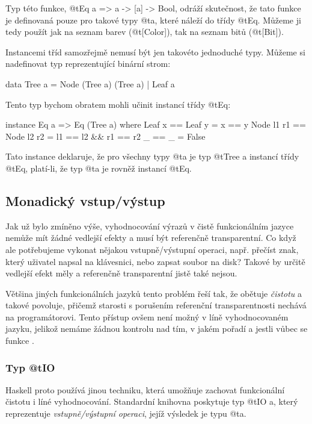 Typ této funkce, @t{Eq a => a -> [a] -> Bool}, odráží skutečnost, že tato funkce
je definovaná pouze pro takové typy @t{a}, které náleží do třídy @t{Eq}. Můžeme
ji tedy použít jak na seznam barev (@t{[Color]}), tak na seznam bitů
(@t{[Bit]}).

Instancemi tříd samozřejmě nemusí být jen takovéto jednoduché typy.  Můžeme si
nadefinovat typ reprezentující binární strom:

\begin{haskell}
data Tree a = Node (Tree a) (Tree a) | Leaf a
\end{haskell}

Tento typ bychom obratem mohli učinit instancí třídy @t{Eq}:

\begin{haskell}
instance Eq a => Eq (Tree a) where
  Leaf x == Leaf y         = x == y
  Node l1 r1 == Node l2 r2 = l1 == l2 && r1 == r2
  _ == _ = False
\end{haskell}

Tato instance deklaruje, že pro všechny typy @t{a} je typ @t{Tree a} instancí
třídy @t{Eq}, platí-li, že typ @t{a} je rovněž instancí @t{Eq}.

\subsection{Monadický vstup/výstup}

Jak už bylo zmíněno výše, vyhodnocování výrazů v čistě funkcionálním jazyce
nemůže mít žádné vedlejší efekty a musí být referenčně transparentní. Co když
ale potřebujeme vykonat nějakou vstupně/výstupní operaci, např. přečíst znak,
který uživatel napsal na klávesnici, nebo zapsat soubor na disk? Takové
 by určitě vedlejší efekt měly a referenčně transparentní jistě také
nejsou.

Většina jiných funkcionálních jazyků tento problém řeší tak, že obětuje
\emph{čistotu} a takové  povoluje, přičemž starosti s
porušením referenční transparentnosti nechává na programátorovi. Tento přístup
ovšem není možný v líně vyhodnocovaném jazyku, jelikož nemáme žádnou kontrolu
nad tím, v jakém pořadí a jestli vůbec se funkce .

\subsubsection{\texorpdfstring{Typ @t{IO}}{Typ IO}}

Haskell proto používá jinou techniku, která umožňuje zachovat funkcionální
čistotu i líné vyhodnocování. Standardní knihovna poskytuje typ @t{IO a}, který
reprezentuje \emph{vstupně/výstupní operaci}, jejíž výsledek je typu @t{a}.

